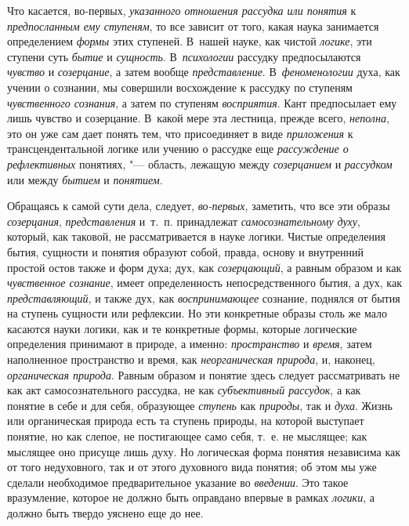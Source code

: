 Что касается, во-первых, {\em указанного отношения рассудка или понятия}
к {\em предпосланным ему ступеням}, то все зависит от того, какая наука
занимается определением {\em формы} этих ступеней. В~нашей науке, как
чистой {\em логике}, эти ступени суть {\em бытие} и {\em сущность}.
В~{\em психологии} рассудку предпосылаются {\em чувство} и
{\em созерцание}, а затем вообще {\em представление}. В~{\em феноменологии}
духа, как учении о сознании, мы совершили восхождение к рассудку по
ступеням {\em чувственного сознания}, а затем по ступеням
{\em восприятия}.  Кант предпосылает ему лишь чувство и созерцание. В~какой
мере эта лестница, прежде всего, {\em неполна}, это он уже сам дает
понять тем, что присоединяет в виде {\em приложения} к трансцендентальной
логике или учению о рассудке еще {\em рассуждение о рефлективных}
понятиях, "--- область, лежащую между {\em созерцанием} и {\em рассудком}
или между {\em бытием} и {\em понятием}.

Обращаясь к самой сути дела, следует, {\em во-первых},
заметить, что все эти образы {\em созерцания}, {\em представления}
и~т.~п. принадлежат {\em самосознательному духу},
который, как таковой, не рассматривается в науке логики.
Чистые определения бытия, сущности и понятия образуют собой, правда, основу
и внутренний простой остов также и форм духа; дух, как
{\em созерцающий}, а равным образом и как {\em чувственное сознание},
имеет определенность непосредственного бытия, а дух, как {\em представляющий},
и также дух, как {\em воспринимающее}
сознание, поднялся от бытия на ступень сущности или
рефлексии. Но эти конкретные образы столь же мало касаются науки логики,
как и те конкретные формы, которые логические определения принимают в
природе, а именно: {\em пространство} и {\em время},
затем наполненное пространство и время, как
{\em неорганическая природа}, и, наконец, {\em органическая природа}.
Равным образом и понятие здесь следует рассматривать не как
акт самосознательного рассудка, не как {\em субъективный рассудок},
а как понятие в себе и для себя, образующее {\em ступень} как
{\em природы}, так и {\em духа}. Жизнь или
органическая природа есть та ступень природы, на которой выступает понятие,
но как слепое, не постигающее само себя, т.~е. не мыслящее; как мыслящее
оно присуще лишь духу. Но логическая форма понятия независима как от того
недуховного, так и от этого духовного вида понятия; об этом мы уже сделали
необходимое предварительное указание во {\em введении}. Это такое
вразумление, которое не должно быть оправдано впервые в рамках
{\em логики}, а должно быть твердо уяснено еще до нее.

